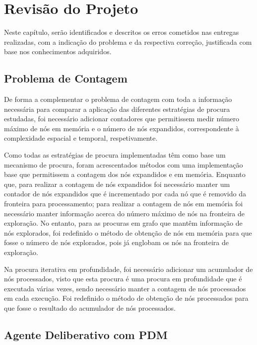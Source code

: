 \chapter{Revisão do Projeto}\label{ch:revisao-projeto}

Neste capítulo, serão identificados e descritos os erros cometidos nas entregas realizadas, com a indicação do problema e da respectiva correção, justificada com base nos conhecimentos adquiridos.


\section{Problema de Contagem}\label{sec:problema-de-contagem}

De forma a complementar o problema de contagem com toda a informação necessária para comparar a aplicação das diferentes estratégias de procura estudadas, foi necessário adicionar contadores que permitissem medir número máximo de nós em memória e o número de nós expandidos, correspondente à complexidade espacial e temporal, respetivamente.

Como todas as estratégias de procura implementadas têm como base um mecanismo de procura, foram acrescentados métodos com uma implementação base que permitissem a contagem dos nós expandidos e em memória.
Enquanto que, para realizar a contagem de nós expandidos foi necessário manter um contador de nós expandidos que é incrementado por cada nó que é removido da fronteira para processamento; para realizar a contagem de nós em memória foi necessário manter informação acerca do número máximo de nós na fronteira de exploração.
No entanto, para as procuras em grafo que mantêm informação de nós explorados, foi redefinido o método de obtenção de nós em memória para que fosse o número de nós explorados, pois já englobam os nós na fronteira de exploração.

Na procura iterativa em profundidade, foi necessário adicionar um acumulador de nós processados, visto que esta procura é uma procura em profundidade que é executada várias vezes, sendo necessário manter a contagem de nós processados em cada execução.
Foi redefinido o método de obtenção de nós processados para que fosse o resultado do acumulador de nós processados.


\section{Agente Deliberativo com PDM}\label{sec:agente-deliberativo-com-pdm}


